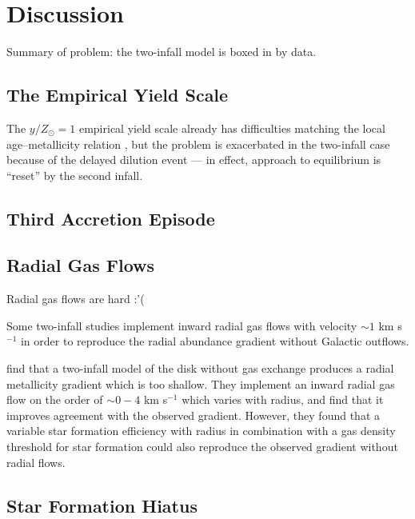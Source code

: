 \documentclass[twocolumn,twocolappendix,linenumbers]{aastex631}
\newcommand{\todo}[1]{{\color{red}#1}}
\newcommand{\yZ}[1]{$y/Z_\odot=#1$}
\begin{document}
\section{Discussion}
\label{sec:discussion}

\todo{Summary of problem: the two-infall model is boxed in by data.}

\subsection{The Empirical Yield Scale}

The \yZ{1} empirical yield scale already has difficulties matching the local age--metallicity relation \citep{johnson_milky_2024}, but the problem is exacerbated in the two-infall case because of the delayed dilution event --- in effect, approach to equilibrium is ``reset'' by the second infall.

\subsection{Third Accretion Episode}

\subsection{Radial Gas Flows}
\label{sec:radial-flows}

\todo{Radial gas flows are hard :'(}

Some two-infall studies \citep[e.g.,][]{spitoni_effects_2011,palla_chemical_2020,palla_mapping_2024} implement inward radial gas flows with velocity $\sim1$ km s$^{-1}$ in order to reproduce the radial abundance gradient without Galactic outflows.

\citet{spitoni_effects_2011} find that a two-infall model of the disk without gas exchange produces a radial metallicity gradient which is too shallow. They implement an inward radial gas flow on the order of $\sim0-4$ km s$^{-1}$ which varies with radius, and find that it improves agreement with the observed gradient. However, they found that a variable star formation efficiency with radius in combination with a gas density threshold for star formation could also reproduce the observed gradient without radial flows.

\subsection{Star Formation Hiatus}
\label{sec:sfe-hiatus}
\end{document}
